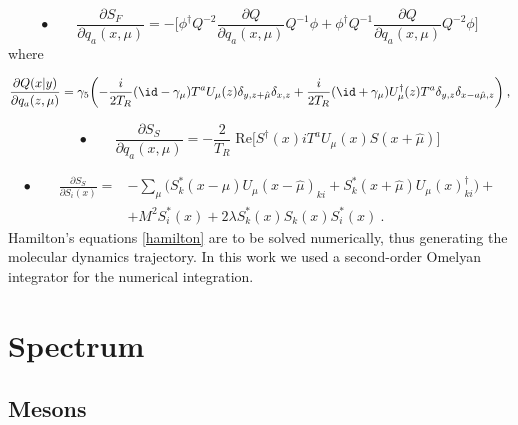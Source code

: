 \begin{equation}
\bullet \qquad\frac{\partial S_F}{\partial q_a(x,\mu)} =   -\biggl[ \phi^{\dagger} Q^{-2}\frac{\partial Q}{\partial q_a(x,\mu)} Q^{-1} \phi + \phi^{\dagger} Q^{-1} \frac{\partial Q}{\partial q_a(x,\mu)} Q^{-2} \phi \biggr] 
\end{equation}
%
where

\begin{equation}
\frac{\partial Q(x \vert y)}{\partial q_a(z,\mu)} = \gamma_5 \biggl( -\frac{i}{2T_R} (\id - \gamma_{\mu}) T^a U_{\mu}(z) \delta_{y,z+\hat\mu} \delta_{x,z} +\frac{i}{2T_R}(\id + \gamma_{\mu}) U_{\mu}^{\dagger}(z) T^a \delta_{y,z} \delta_{x-a\hat\mu,z} \biggr) \: ,
\end{equation}


\begin{equation}
\bullet \qquad
\frac{\partial S_S}{\partial q_a(x,\mu)} = - \frac{2}{T_R} \; \mathrm{Re} \biggl[ S^{\dagger}(x) i T^a U_{\mu}(x) S(x+\hat\mu) \biggr] 
\end{equation}



\begin{equation}
\begin{split}
\bullet \qquad
\frac{\partial S_S}{\partial S_i(x)} = & - \sum_{\mu} \biggl( S^*_k(x-\hat \mu) U_{\mu}(x-\hat\mu)_{ki} + S^*_k(x+\hat\mu) U_{\mu}(x)^{\dagger}_{ki} \biggr) +  \\
& + M^2 S_i^*(x) + 2 \lambda S_k^*(x) S_k(x) S_i^*(x) \: .
\end{split}
\end{equation}
%
Hamilton's equations \ref{hamilton} are to be solved numerically, thus generating the molecular dynamics trajectory. In this work we used a second-order Omelyan integrator \cite{PhysRevE.65.056706,OMELYAN2003272} for the numerical integration.




\section{Spectrum}


\subsection{Mesons}
\label{meson_spectrum}

